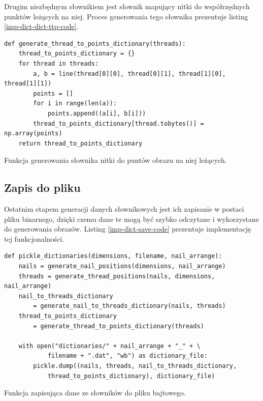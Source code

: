         Drugim niezbędnym słownikiem jest słownik mapujący nitki do współrzędnych punktów leżących na niej. Proces generowania tego słownika prezentuje listing \ref{imp-dict-dict-ttp-code}.
        \begin{code}[htb]
        \begin{verbatim}
def generate_thread_to_points_dictionary(threads):
    thread_to_points_dictionary = {}
    for thread in threads:
        a, b = line(thread[0][0], thread[0][1], thread[1][0], thread[1][1])
        points = []
        for i in range(len(a)):
            points.append((a[i], b[i]))
        thread_to_points_dictionary[thread.tobytes()] = np.array(points)
    return thread_to_points_dictionary
        \end{verbatim}
        \caption{Funkcja generowania słownika nitki do puntów obrazu na niej leżących.}
        \label{imp-dict-dict-ttp-code}
        \end{code}
        
        \subsection{Zapis do pliku} \label{imp-dict-save}
        Ostatnim etapem generacji danych słownikowych jest ich zapisanie w postaci pliku binarnego, dzięki czemu dane te mogą być szybko odczytane i wykorzystane do generowania obrazów. Listing \ref{imp-dict-save-code} prezentuje implementację tej funkcjonalności.
        \begin{code}[htb]
        \begin{verbatim}
def pickle_dictionaries(dimensions, filename, nail_arrange):
    nails = generate_nail_positions(dimensions, nail_arrange)
    threads = generate_thread_positions(nails, dimensions, nail_arrange)
    nail_to_threads_dictionary 
        = generate_nail_to_threads_dictionary(nails, threads)
    thread_to_points_dictionary 
        = generate_thread_to_points_dictionary(threads)

    with open("dictionaries/" + nail_arrange + "_" + \
            filename + ".dat", "wb") as dictionary_file:
        pickle.dump((nails, threads, nail_to_threads_dictionary, 
            thread_to_points_dictionary), dictionary_file)
        \end{verbatim}
        \caption{Funkcja zapisująca dane ze słowników do pliku bajtowego.}
        \label{imp-dict-save-code}
        \end{code}
        
